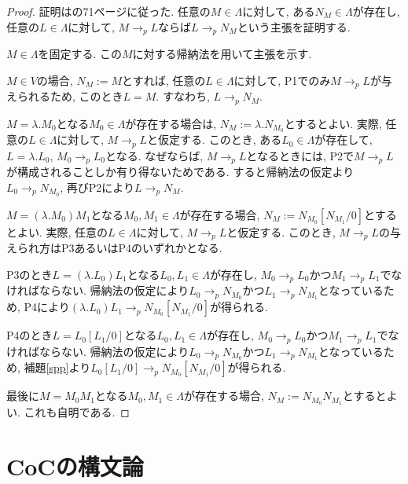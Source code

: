\documentclass{ltjsarticle}
\begin{document}
\begin{proof}
 証明は\cite{高橋正子1991計算論}の71ページに従った.
任意の$M \in \Lambda$に対して, ある$N_M \in \Lambda$が存在し, 任意の$L \in \Lambda$に対して, $M \rightarrow_p L$ならば$L \rightarrow_p N_M$という主張を証明する.

$M \in \Lambda$を固定する. この$M$に対する帰納法を用いて主張を示す.

$M \in V$の場合, $N_M := M$とすれば, 任意の$L \in \Lambda$に対して, P1でのみ$M \rightarrow_p L$が与えられるため, このとき$L = M$. すなわち, $L \rightarrow_p N_M$.

$M = \lambda. M_0$となる$M_0 \in \Lambda$が存在する場合は, $N_M := \lambda. N_{M_0}$とするとよい.
実際, 任意の$L \in \Lambda$に対して, $M \rightarrow_p L$と仮定する.
このとき, ある$L_0 \in \Lambda$が存在して, $L = \lambda. L_0$, $M_0 \rightarrow_p L_0$となる.
なぜならば, $M \rightarrow_p L$となるときには, P2で$M \rightarrow_p L$が構成されることしか有り得ないためである.
すると帰納法の仮定より$L_0 \rightarrow_p N_{M_0}$, 再びP2により$L \rightarrow_p N_M$.

$M = (\lambda. M_0) M_1$となる$M_0, M_1 \in \Lambda$が存在する場合, $N_M := N_{M_0}[N_{M_1}/0]$とするとよい. 実際, 任意の$L \in \Lambda$に対して, $M \rightarrow_p L$と仮定する. このとき, $M \rightarrow_p L$の与えられ方はP3あるいはP4のいずれかとなる.
 
 P3のとき$L = (\lambda. L_0) L_1$となる$L_0, L_1 \in \Lambda$が存在し, $M_0 \rightarrow_p L_0$かつ$M_1 \rightarrow_p L_1$でなければならない. 帰納法の仮定により$L_0 \rightarrow_p N_{M_0}$かつ$L_1 \rightarrow_p N_{M_1}$となっているため, P4により$(\lambda. L_0) L_1 \rightarrow_p N_{M_0} [N_{M_1}/0]$が得られる.
 
 P4のとき$L = L_0 [L_1/0]$となる$L_0, L_1 \in \Lambda$が存在し, $M_0 \rightarrow_p L_0$かつ$M_1 \rightarrow_p L_1$でなければならない. 帰納法の仮定により$L_0 \rightarrow_p N_{M_0}$かつ$L_1 \rightarrow_p N_{M_1}$となっているため, 補題\ref{spp}より$L_0 [L_1/0] \rightarrow_p N_{M_0} [N_{M_1}/0]$が得られる.
 
最後に$M = M_0 M_1$となる$M_0, M_1 \in \Lambda$が存在する場合, $N_M := N_{M_0} N_{M_1}$とするとよい. これも自明である.
\end{proof}


\section{CoCの構文論}
\end{document}

